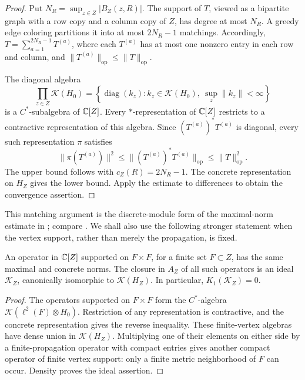 \begin{proof}
Put $N_R=\sup_{z\in Z}|B_Z(z,R)|$.  The support of $T$, viewed as a bipartite
graph with a row copy and a column copy of $Z$, has degree at most $N_R$.
A greedy edge coloring partitions it into at most $2N_R-1$ matchings.
Accordingly, $T=\sum_{a=1}^{2N_R-1}T^{(a)}$, where each $T^{(a)}$ has at most
one nonzero entry in each row and column, and
$\|T^{(a)}\|_{\mathrm{op}}\leq\|T\|_{\mathrm{op}}$.

The diagonal algebra
\[
 \prod_{z\in Z}\mathcal K(H_0)
 =\left\{\operatorname{diag}(k_z): k_z\in\mathcal K(H_0),\
                  \sup_z\|k_z\|<\infty\right\}
\]
is a $C^*$-subalgebra of $\mathbb C[Z]$.  Every $*$-representation of $\mathbb C[Z]$
restricts to a contractive representation of this algebra.  Since
$(T^{(a)})^*T^{(a)}$ is diagonal, every such representation $\pi$ satisfies
\[
 \|\pi(T^{(a)})\|^2
 \leq\|(T^{(a)})^*T^{(a)}\|_{\mathrm{op}}
 \leq\|T\|_{\mathrm{op}}^2.
\]
The upper bound follows with $c_Z(R)=2N_R-1$.  The concrete representation
on $H_Z$ gives the lower bound.  Apply the estimate to differences to
obtain the convergence assertion.
\end{proof}

This matching argument is the discrete-module form of the maximal-norm
estimate in \cite[Lemma~2.1]{OOY09}; compare
\cite[Lemma~1.10]{SW13}.  We shall also use the following stronger statement
when the vertex support, rather than merely the propagation, is fixed.

\begin{lemma}
\label{ana:compacts}
An operator in $\mathbb C[Z]$ supported on $F\times F$, for a finite set $F\subset Z$,
has the same maximal and concrete norms.  The closure in $A_Z$ of all such
operators is an ideal $\mathcal K_Z$, canonically isomorphic to
$\mathcal K(H_Z)$.  In particular, $K_1(\mathcal K_Z)=0$.
\end{lemma}

\begin{proof}
The operators supported on $F\times F$ form the $C^*$-algebra
$\mathcal K(\ell^2(F)\otimes H_0)$.  Restriction of any representation is
contractive, and the concrete representation gives the reverse inequality.
These finite-vertex algebras have dense union in $\mathcal K(H_Z)$.
Multiplying one of their elements on either side by a finite-propagation
operator with compact entries gives another compact operator of finite
vertex support: only a finite metric neighborhood of $F$ can occur.
Density proves the ideal assertion.
\end{proof}

